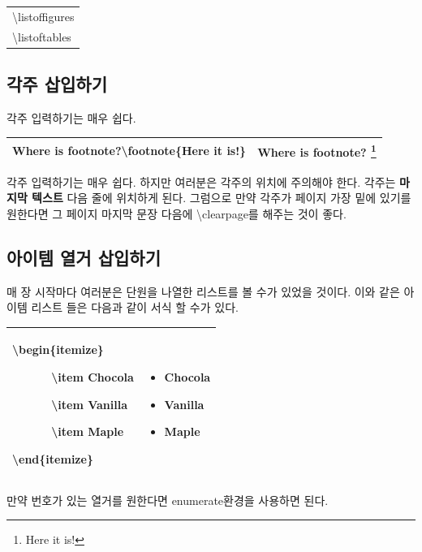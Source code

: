 \documentclass[12pt]{article}
\begin{document}
	\begin{tabularx}{\textwidth \onehalfspacing}{|X|}
		\hline
		\textbackslash listoffigures\\
		\textbackslash listoftables\\
		\hline
	\end{tabularx}
	\subsection{각주 삽입하기}
	각주 입력하기는 매우 쉽다.\\
	
	\begin{tabularx}{\textwidth \onehalfspacing}{|X|X|}
		\hline
		Where is footnote?\textbackslash footnote\{Here it is!\}&Where is footnote? \footnote{Here it is!}\\
		\hline
	\end{tabularx}
	\newline\newline
	각주 입력하기는 매우 쉽다. 하지만 여러분은 각주의 위치에 주의해야 한다. 각주는 \textbf{마지막 텍스트} 다음 줄에 위치하게 된다. 그럼으로 만약 각주가 페이지 가장 밑에 있기를 원한다면 그 페이지 마지막 문장 다음에 \textbackslash clearpage를 해주는 것이 좋다.\clearpage
	\subsection{아이템 열거 삽입하기}
	매 장 시작마다 여러분은 단원을 나열한 리스트를 볼 수가 있었을 것이다. 이와 같은 아이템 리스트 들은 다음과 같이 서식 할 수가 있다.\newline
	
	\begin{tabularx}{\textwidth \onehalfspacing}{|X|X|}
		\hline
		\textbackslash begin\{itemize\}
		
		\ \ \ \ \ \ \textbackslash item Chocola
		
		\ \ \ \ \ \ \textbackslash item Vanilla
		
		\ \ \ \ \ \ \textbackslash item Maple
		
		\textbackslash end\{itemize\}
		&
		\begin{itemize}
			\item Chocola
			\item Vanilla
			\item Maple
		\end{itemize}
		\\
		\hline
	\end{tabularx}
	\newline\newline
	만약 번호가 있는 열거를 원한다면 enumerate환경을 사용하면 된다.\newline
	
\end{document}
